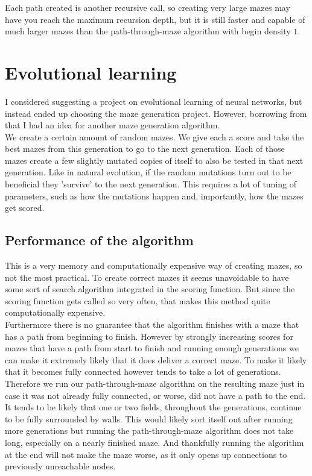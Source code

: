 \documentclass[10pt, a4paper, twoside]{amsart}
\newcommand{\1}{\mathbbm{1}}
\begin{document}
Each path created is another recursive call, so creating very large mazes may have you reach the maximum recursion depth, but it is still faster and capable of much larger mazes than the path-through-maze algorithm with begin density $1$.


\section{Evolutional learning}
I considered suggesting a project on evolutional learning of neural networks, but instead ended up choosing the maze generation project. However, borrowing from that I had an idea for another maze generation algorithm.\\

We create a certain amount of random mazes. We give each a score and take the best mazes from this generation to go to the next generation. Each of those mazes create a few slightly mutated copies of itself to also be tested in that next generation. Like in natural evolution, if the random mutations turn out to be beneficial they 'survive' to the next generation. This requires a lot of tuning of parameters, such as how the mutations happen and, importantly, how the mazes get scored.

\subsection{Performance of the algorithm}
This is a very memory and computationally expensive way of creating mazes, so not the most practical. To create correct mazes it seems unavoidable to have some sort of search algorithm integrated in the scoring function. But since the scoring function gets called so very often, that makes this method quite computationally 	expensive.\\

Furthermore there is no guarantee that the algorithm finishes with a maze that has a path from beginning to finish. However by strongly increasing scores for mazes that have a path from start to finish and running enough generations we can make it extremely likely that it does deliver a correct maze. To make it likely that it becomes fully connected however tends to take a lot of generations. Therefore we run our path-through-maze algorithm on the resulting maze just in case it was not already fully connected, or worse, did not have a path to the end. It tends to be likely that one or two fields, throughout the generations, continue to be fully surrounded by walls. This would likely sort itself out after running more generations but running the path-through-maze algorithm does not take long, especially on a nearly finished maze. And thankfully running the algorithm at the end will not make the maze worse, as it only opens up connections to previously unreachable nodes.
\end{document}
